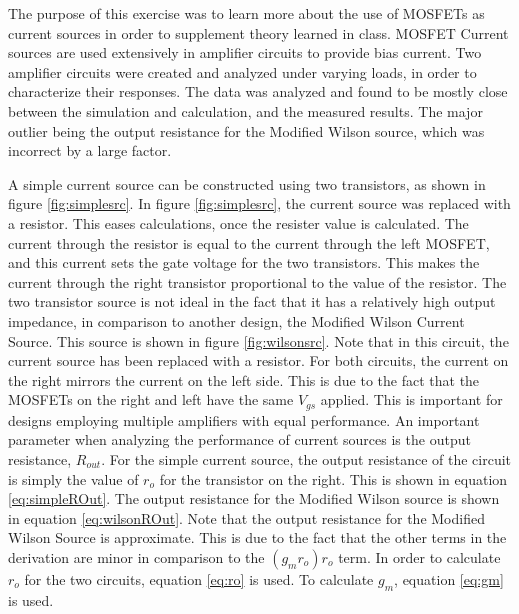 
\def \labnum	{\#3}
\def \tonames   {Tyler Nicholson}
\def \disptitle	{MOSFET Current Sources}
\def \datestart	{03-20-2015}
\def \dateend	{04-03-2015}






The purpose of this exercise was to learn more about the use of MOSFETs as current sources in order to supplement theory learned in class. 
MOSFET Current sources are used extensively in amplifier circuits to provide bias current. 
Two amplifier circuits were created and analyzed under varying loads, in order to characterize their responses. 
The data was analyzed and found to be mostly close between the simulation and calculation, and the measured results. The major outlier being the output resistance for the Modified Wilson source, which was incorrect by a large factor. 

A simple current source can be constructed using two transistors, as shown in figure \ref{fig:simplesrc}.
In figure \ref{fig:simplesrc}, the current source was replaced with a resistor. This eases calculations, once the resister value is calculated. 
The current through the resistor is equal to the current through the left MOSFET, and this current sets the gate voltage for the two transistors. This makes the current through the right transistor proportional to the value of the resistor. 
The two transistor source is not ideal in the fact that it has a relatively high output impedance, in comparison to another design, the Modified Wilson Current Source. This source is shown in figure \ref{fig:wilsonsrc}. Note that in this circuit, the current source has been replaced with a resistor. For both circuits, the current on the right mirrors the current on the left side. This is due to the fact that the MOSFETs on the right and left have the same $V_{gs}$ applied. 
This is important for designs employing multiple amplifiers with equal performance. 
An important parameter when analyzing the performance of current sources is the output resistance, $R_{out}$. For the simple current source, the output resistance of the circuit is simply the value of $r_o$ for the transistor on the right. This is shown in equation \ref{eq:simpleROut}.
The output resistance for the Modified Wilson source is shown in equation \ref{eq:wilsonROut}. 
Note that the output resistance for the Modified Wilson Source is approximate. This is due to the fact that the other terms in the derivation are minor in comparison to the $(g_mr_o)r_o$ term. 
In order to calculate $r_o$ for the two circuits, equation \ref{eq:ro} is used. To calculate $g_m$, equation \ref{eq:gm} is used. 

